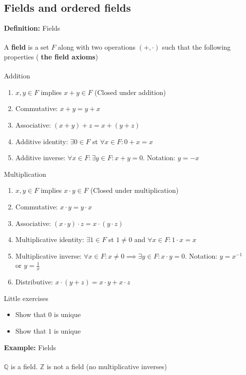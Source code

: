 \documentclass{article}
\newcommand{\Z}{\mathbb{Z}}
\newcommand{\Q}{\mathbb{Q}}
\begin{document}
\subsection{Fields and ordered fields}
\begin{definition} 
\textbf{Definition:} Fields \\
~\\
A {\color{blue} \textbf{field}} is a set $F$ along with two operations $(+,\cdot)$ such that the following properties ({\color{blue} \textbf{the field axioms}}) \\
~\\
Addition
\begin{enumerate}
	\item $x,y\in F$ implies $x+y\in F$ (Closed under addition)
	\item Commutative: $x+y = y+x$
	\item Associative: $(x+y)+z = x + (y+z)$
	\item Additive identity: $\exists 0\in F$ st $\forall x\in F: 0+x=x$
	\item Additive inverse: $\forall x\in F: \exists y\in F: x+y=0$. Notation: $y=-x$
\end{enumerate}
Multiplication
\begin{enumerate}
	\item $x,y\in F$ implies $x\cdot y\in F$ (Closed under multiplication)
	\item Commutative: $x\cdot y = y\cdot x$
	\item Associative: $(x\cdot y)\cdot z = x \cdot (y\cdot z)$
	\item Multiplicative identity: $\exists 1\in F$ st $1\neq 0$ and $\forall x\in F: 1\cdot x=x$
	\item Multiplicative inverse: $\forall x\in F: x\neq 0 \implies \exists y\in F: x\cdot y=0$. Notation: $y=x^{-1}$ or $y=\frac{1}{x}$ 
	\item Distributive: $x\cdot (y+z) = x\cdot y + x\cdot z$
\end{enumerate}
Little exercises
\begin{itemize}
	\item Show that $0$ is unique
	\item Show that $1$ is unique
\end{itemize}
\end{definition}
\begin{example} 
\textbf{Example:} Fields \\
~\\
$\Q$ is a field. $\Z$ is not a field (no multiplicative inverses)
\end{example}
\end{document}
